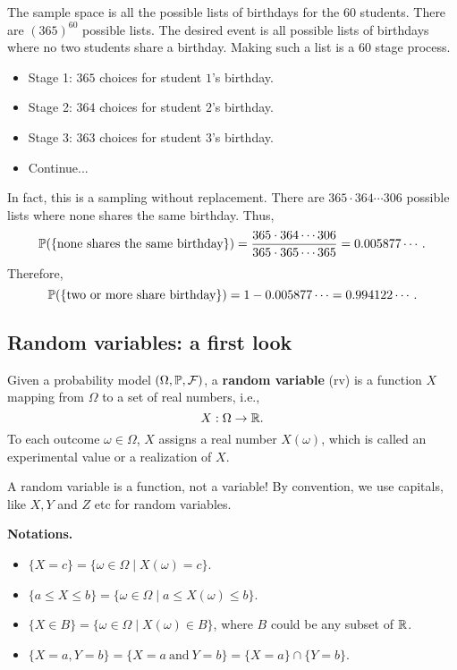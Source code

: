   The sample space is all the possible lists of birthdays for the $60$ students.
  There are $(365)^{60}$ possible lists. The desired event is all possible lists
  of birthdays where no two students share a birthday. Making such a list is a
  $60$ stage process.
  \begin{itemize}
  \item Stage 1: $365$ choices for student $1$'s birthday.
  \item Stage 2: $364$ choices for student $2$'s birthday.
  \item Stage 3: $363$ choices for student $3$'s birthday.
  \item Continue...
  \end{itemize}
  In fact, this is a sampling without replacement. There are $365\cdot 364\cdots
  306$ possible lists where none shares the same birthday. Thus,
  \[
    \mathbb{P}(\{\text{none shares the same birthday}\}) = \frac{365\cdot 364\cdots
      306}{365\cdot 365\cdots 365} = 0.005877\cdots.
  \]
  Therefore,
  \[
    \mathbb{P}(\{\text{two or more share birthday}\}) = 1- 0.005877\cdots = 0.994122\cdots.
  \]





  
  \subsection{Random variables: a first look}
  \label{subsec:1.5}
  \begin{definition}
    Given a probability model $(\Omega, \mathbb{P}, \mathcal{F})$, a \textbf{random variable} (rv) is a
   function $X$ mapping from $\Omega$ to a set of real numbers, i.e.,
   \[
     X: \Omega \to \mathbb{R}.
   \]
   To each outcome $\omega\in \Omega$, $X$ assigns a real number $X(\omega)$,
   which is called an experimental value or a realization of $X$.
 \end{definition}
 
  \begin{remark}
   A random variable is a function, not a variable! By convention, we use
   capitals, like $X, Y$  and $Z$ etc for random variables. 
  \end{remark}
  \textbf{Notations.}
  \begin{itemize}
  \item $\{X = c\} = \{\omega\in \Omega\mid X(\omega) = c\}$.
  \item $\{a\le X\le b\} = \{\omega\in \Omega\mid a\le X(\omega)\le b\}$.
  \item $\{X\in B\} = \{\omega\in \Omega\mid X(\omega)\in B\}$, where $B$ could
    be any subset of $\mathbb{R}$.
  \item $\{X = a, Y = b\} = \{X=a~\text{and}~Y=b\} = \{X=a\}\cap \{Y = b\}$.
  \end{itemize}

